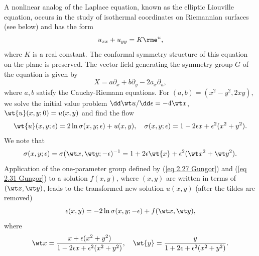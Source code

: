 \begin{example}
    A nonlinear analog of the Laplace equation, known as the elliptic Liouville equation, occurs in the study of isothermal coordinates on Riemannian surfaces (see below) and has the form 
    \[u_{xx}+u_{yy}=K\rme^{u},\]
    where $K$ is a real constant. The conformal symmetry structure of this equation on the plane is preserved. The vector field generating the symmetry group $G$ of the equation is given by 
    \[X=a\partial_x+b\partial_y-2a_x\partial_u,\]
    where $a,b$ satisfy the Cauchy-Riemann equations. For $(a,b)=(x^2-y^2,2xy)$, we solve the initial value problem $\dd \wt u/\dd\epsilon=-4\wt x$, $\wt{u}(x,y;0)=u(x,y)$ and find the flow 
    \[\wt{u}(x,y;\epsilon)=2\ln \sigma(x,y;\epsilon)+u(x,y),\quad \sigma(x,y;\epsilon)=1-2\epsilon x+\epsilon^2(x^2+y^2).\label{eq 2.31 Gungor}\]
    We note that 
    \[\sigma(x,y;\epsilon)=\sigma(\wt x,\wt y;-\epsilon)^{-1}=1+2\epsilon \wt{x}+\epsilon^2(\wt x^2+\wt y^2).\]
    Application of the one-parameter group defined by (\ref{eq 2.27 Gungor}) and (\ref{eq 2.31 Gungor}) to a solution $f(x,y)$, where $(x,y)$ are written in terms of $(\wt x,\wt y)$, leads to the transformed new solution $u(x,y)$ (after the tildes are removed)
    \[\epsilon(x,y)=-2\ln\sigma(x,y;-\epsilon)+f(\wt x,\wt y),\]
    where 
    \[\wt x=\frac{x+\epsilon(x^2+y^2)}{1+2\epsilon x+\epsilon^2(x^2+y^2)},\quad \wt{y}=\frac{y}{1+2\epsilon +\epsilon^2(x^2+y^2)}.\]
\end{example}

